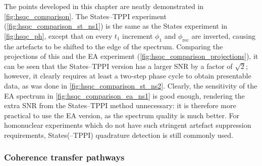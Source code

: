 The points developed in this chapter are neatly demonstrated in \cref{fig:hsqc_comparison}.
The States--TPPI experiment (\cref{fig:hsqc_comparison_st_ns1}) is the same as the States experiment in \cref{fig:hsqc_ph}, except that on every $t_1$ increment $\phi_1$ and $\phi_\text{rec}$ are inverted, causing the artefacts to be shifted to the edge of the spectrum.
Comparing the projections of this and the EA experiment (\cref{fig:hsqc_comparison_projections}), it can be seen that the States--TPPI version has a larger SNR by a factor of $\sqrt{2}$; however, it clearly requires at least a two-step phase cycle to obtain presentable data, as was done in \cref{fig:hsqc_comparison_st_ns2}.
Clearly, the sensitivity of the EA spectrum in \cref{fig:hsqc_comparison_ea_ns1} is good enough, rendering the extra SNR from the States--TPPI method unnecessary: it is therefore more practical to use the EA version, as the spectrum quality is much better.
For homonuclear experiments which do not have such stringent artefact suppression requirements, States(--TPPI) quadrature detection is still commonly used.


\subsubsection{Coherence transfer pathways}

